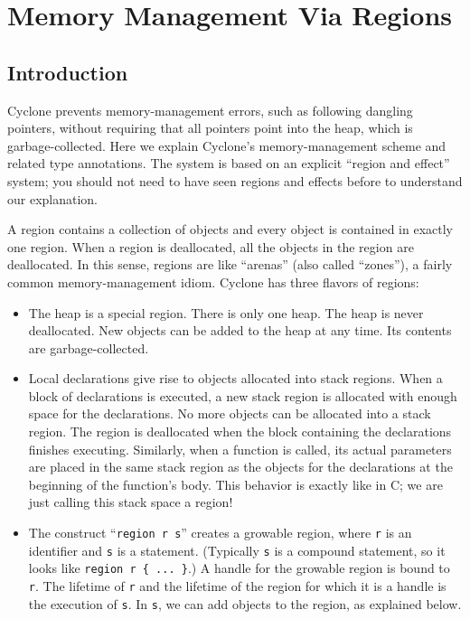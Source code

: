 \section{Memory Management Via Regions}


\subsection{Introduction}

Cyclone prevents memory-management errors, such as following dangling
pointers, without requiring that all pointers point into the heap,
which is garbage-collected.  Here we explain Cyclone's
memory-management scheme and related type annotations.  The system is
based on an explicit ``region and effect'' system; you should not need
to have seen regions and effects before to understand our explanation.

A region contains a collection of objects and every object is
contained in exactly one region.  When a region is deallocated, all
the objects in the region are deallocated.  In this sense, regions are
like ``arenas'' (also called ``zones''), a fairly common
memory-management idiom.  Cyclone has three flavors of regions:
\begin{itemize}
\item The heap is a special region.  There is only one heap.  The heap
  is never deallocated.  New objects can be added to the heap at any
  time.  Its contents are garbage-collected.

\item Local declarations give rise to objects allocated into stack
  regions.  When a block of declarations is executed, a new stack
  region is allocated with enough space for the declarations.  No more
  objects can be allocated into a stack region.  The region is
  deallocated when the block containing the declarations finishes
  executing.  Similarly, when a function is called, its actual
  parameters are placed in the same stack region as the objects for
  the declarations at the beginning of the function's body.  This
  behavior is exactly like in C; we are just calling this stack space
  a region!
  
\item The construct ``\texttt{region r s}'' creates a growable region,
  where \texttt{r} is an identifier and \texttt{s} is a statement.
  (Typically \texttt{s} is a compound statement, so it looks like
  \verb|region r { ... }|.)  A handle for the growable region is bound
  to \texttt{r}.  The lifetime of \texttt{r} and the lifetime of the
  region for which it is a handle is the execution of \texttt{s}.  In
  \texttt{s}, we can add objects to the region, as explained below.
\end{itemize}


